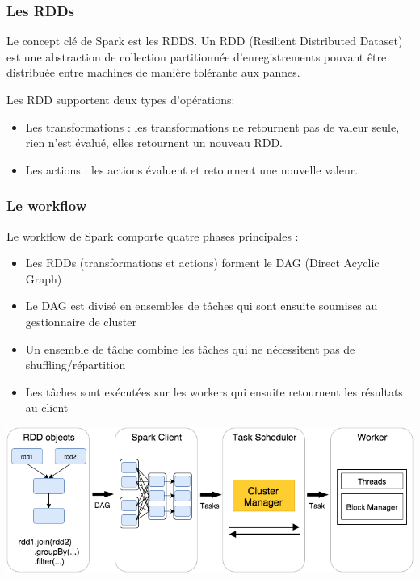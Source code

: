 \documentclass[a4paper, 11pt, titlepage]{article}
\begin{document}
\subsubsection* {Les RDDs}


Le concept clé de Spark est les RDDS. Un RDD (Resilient Distributed Dataset) est une abstraction de collection partitionnée d'enregistrements pouvant être distribuée entre machines de manière tolérante aux pannes. 


Les RDD supportent deux types d'opérations:

\begin{itemize}

\item
Les transformations : les transformations ne retournent pas de valeur seule, rien n'est évalué, elles retournent un nouveau RDD.

\item
Les actions : les actions évaluent et retournent une nouvelle valeur.

\end{itemize}



\subsubsection* {Le workflow}


Le workflow de Spark comporte quatre phases principales :

\begin{itemize}

\item
Les RDDs (transformations et actions) forment le DAG (Direct Acyclic Graph)

\item
Le DAG est divisé en ensembles de tâches qui sont ensuite soumises au gestionnaire de cluster

\item
Un ensemble de tâche combine les tâches qui ne nécessitent pas de shuffling/répartition

\item
Les tâches sont exécutées sur les workers qui ensuite retournent les résultats au client

\end{itemize}


\begin{center}
\includegraphics[scale=0.5]{res/workflow_spark.png}
\end{center}
\end{document}
